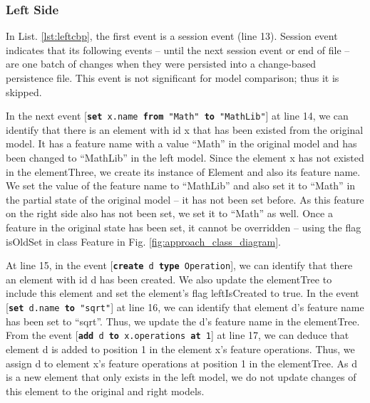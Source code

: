 \documentclass{jot}
\begin{document}
\subsubsection{Left Side}\label{sec:left_side} In List. \ref{lst:leftcbp}, the first event is a \textsf{session} event (line 13). \textsf{Session} event indicates that its following events -- until the next session event or end of file -- are one batch of changes when they were persisted into a change-based persistence file. This event is not significant for model comparison; thus it is skipped. 

In the next event [\texttt{\small \textbf{set} x.name \textbf{from} "Math" \textbf{to} "MathLib"}] at line 14, we can identify that there is an element with id \textsf{x} that has been existed from the original model. It has a feature \textsf{name} with a value ``Math'' in the original model and has been changed to ``MathLib'' in the left model. Since the element \textsf{x} has not existed in the \textsf{elementThree}, we create its instance of \textsf{Element} and also its feature \textsf{name}. We set the value of the feature \textsf{name} to ``MathLib'' and also set it to ``Math'' in the partial state of the original model -- it has not been set before. As this feature on the right side also has not been set, we set it to ``Math'' as well. Once a feature in the original state has been set, it cannot be overridden -- using the flag \textsf{isOldSet} in class \textsf{Feature} in Fig. \ref{fig:approach_class_diagram}. 

At line 15, in the event [\texttt{\small \textbf{create} d \textbf{type} Operation}], we can identify that there an element with id \textsf{d} has been created. We also update the \textsf{elementTree} to include this element and set the element's flag \textsf{leftIsCreated} to \textsf{true}. In the event [\texttt{\small \textbf{set} d.name \textbf{to} "sqrt"}] at line 16, we can identify that element \textsf{d}'s feature \textsf{name} has been set to ``sqrt''. Thus, we update the \textsf{d}'s feature \textsf{name} in the \textsf{elementTree}. From the event [\texttt{\small \textbf{add} d \textbf{to} x.operations \textbf{at} 1}] at line 17, we can deduce that element \textsf{d} is added to position 1 in the element \textsf{x}'s feature \textsf{operations}. Thus, we assign \textsf{d} to element \textsf{x}'s feature \textsf{operations} at position 1 in the \textsf{elementTree}. As \textsf{d} is a new element that only exists in the left model, we do not update changes of this element to the original and right models. 
\end{document}
